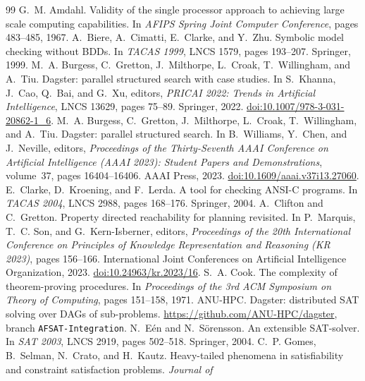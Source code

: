 \documentclass[11pt,a4paper]{article}
\begin{document}
\begin{thebibliography}{99}\small
{} G.~M. Amdahl. Validity of the single processor approach to achieving
  large scale computing capabilities. In \emph{AFIPS Spring Joint Computer Conference},
  pages 483--485, 1967.
 A.~Biere, A.~Cimatti, E.~Clarke, and Y.~Zhu. Symbolic model checking
  without BDDs. In \emph{TACAS 1999}, LNCS 1579, pages 193--207. Springer, 1999.
 M.~A. Burgess, C.~Gretton, J.~Milthorpe, L.~Croak, T.~Willingham, and
  A.~Tiu. Dagster: parallel structured search with case studies. In S.~Khanna, J.~Cao, Q.~Bai, and
  G.~Xu, editors, \emph{PRICAI 2022: Trends in Artificial Intelligence}, LNCS 13629, pages 75--89.
  Springer, 2022. \href{https://doi.org/10.1007/978-3-031-20862-1_6}{doi:10.1007/978-3-031-20862-1\_6}.
 M.~A. Burgess, C.~Gretton, J.~Milthorpe, L.~Croak, T.~Willingham, and
  A.~Tiu. Dagster: parallel structured search. In B.~Williams, Y.~Chen, and J.~Neville, editors,
  \emph{Proceedings of the Thirty-Seventh AAAI Conference on Artificial Intelligence (AAAI 2023):
  Student Papers and Demonstrations}, volume~37, pages 16404--16406. AAAI Press, 2023.
  \href{https://doi.org/10.1609/aaai.v37i13.27060}{doi:10.1609/aaai.v37i13.27060}.
 E.~Clarke, D.~Kroening, and F.~Lerda. A tool for checking ANSI-C
  programs. In \emph{TACAS 2004}, LNCS 2988, pages 168--176. Springer, 2004.
 A.~Clifton and C.~Gretton. Property directed reachability for planning
  revisited. In P.~Marquis, T.~C. Son, and G.~Kern-Isberner, editors, \emph{Proceedings of the 20th
  International Conference on Principles of Knowledge Representation and Reasoning (KR 2023)}, pages
  156--166. International Joint Conferences on Artificial Intelligence Organization, 2023.
  \href{https://doi.org/10.24963/kr.2023/16}{doi:10.24963/kr.2023/16}.
 S.~A. Cook. The complexity of theorem-proving procedures. In
  \emph{Proceedings of the 3rd ACM Symposium on Theory of Computing}, pages 151--158, 1971.
 ANU-HPC. Dagster: distributed SAT solving over DAGs of sub-problems.
  \url{https://github.com/ANU-HPC/dagster}, branch \texttt{AFSAT-Integration}.
 N.~E\'en and N.~S\"orensson. An extensible SAT-solver. In
  \emph{SAT 2003}, LNCS 2919, pages 502--518. Springer, 2004.
 C.~P. Gomes, B.~Selman, N.~Crato, and H.~Kautz. Heavy-tailed
  phenomena in satisfiability and constraint satisfaction problems. \emph{Journal of
}
\end{thebibliography}
\end{document}
